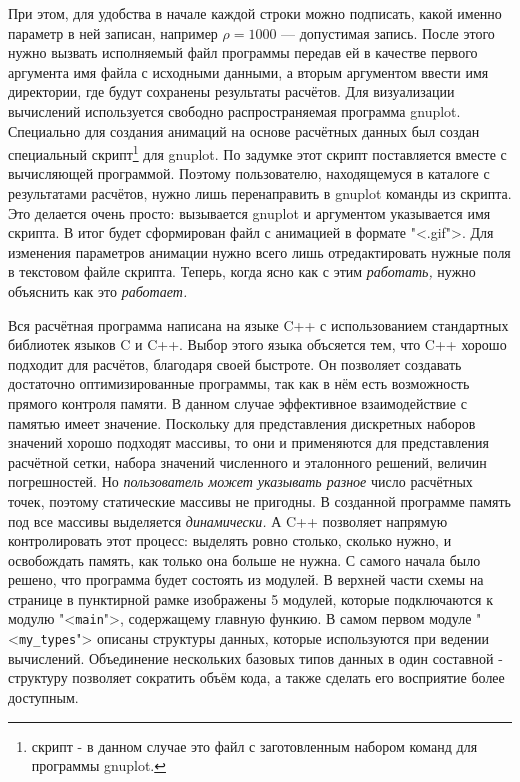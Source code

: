 \documentclass[oneside, final, 14pt]{report}
\begin{document}
При этом, для удобства в начале каждой строки можно подписать, какой именно параметр в ней записан, например $\rho = 1000$ --- допустимая запись. После этого нужно вызвать исполняемый файл программы передав ей в качестве первого аргумента имя файла с исходными данными, а вторым аргументом ввести имя директории, где будут сохранены результаты расчётов. Для визуализации вычислений  используется свободно распространяемая программа gnuplot. Специально для создания анимаций на основе расчётных данных был создан специальный скрипт\footnote{скрипт - в данном случае это файл с заготовленным набором команд для программы gnuplot.} для gnuplot. По задумке этот скрипт поставляется вместе с вычисляющей программой. Поэтому пользователю, находящемуся в каталоге с результатами расчётов, нужно лишь перенаправить в gnuplot команды из скрипта. Это делается очень просто: вызывается gnuplot и аргументом указывается имя скрипта. В итог будет сформирован файл с анимацией в формате "<.gif">. Для изменения параметров анимации нужно всего лишь отредактировать нужные поля в текстовом файле скрипта. Теперь, когда ясно как с этим \emph{работать,} нужно объяснить как это \emph{работает.} 


Вся расчётная программа написана на языке C++ с использованием стандартных библиотек языков C и C++. Выбор этого языка объсяется тем, что C++ хорошо подходит для расчётов, благодаря своей быстроте. Он позволяет создавать достаточно оптимизированные программы, так как в нём есть возможность прямого контроля памяти. В данном случае эффективное взаимодействие с памятью имеет значение. Поскольку для представления дискретных наборов значений хорошо подходят массивы, то они и применяются для представления расчётной сетки, набора значений численного и эталонного решений, величин погрешностей. Но \emph{пользователь может указывать разное} число расчётных точек, поэтому статические массивы не пригодны. В созданной программе память под все массивы выделяется \emph{динамически.} А C++ позволяет напрямую контролировать этот процесс: выделять ровно столько, сколько нужно, и освобождать память, как только она больше не нужна. 
\label{page_model_user}
С самого начала было решено, что программа будет состоять из модулей. В верхней части схемы на странице \pageref{prog_scheme} в пунктирной рамке изображены 5 модулей, которые подключаются к модулю "<\texttt{main}">, содержащему главную функию. В самом первом модуле "<\texttt{my\_types}"> описаны структуры данных, которые используются при ведении вычислений. Объединение нескольких базовых типов данных в один составной - структуру позволяет сократить объём кода, а также сделать его восприятие более доступным.
\end{document}
